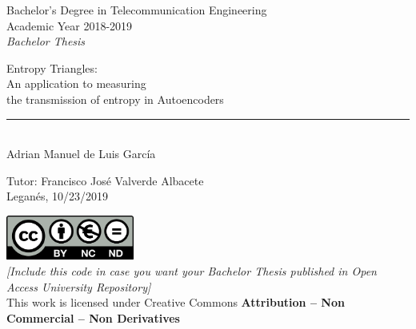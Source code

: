 \documentclass[12pt]{report}
\begin{document}
	
	\begin{titlepage}
		\begin{sffamily}
			\color{azulUC3M}
			\begin{center}
				\begin{figure}[H] %
				\end{figure}
				\vspace{2.5cm}
				\begin{Large}
					Bachelor's Degree in Telecommunication Engineering\\			
					Academic Year 2018-2019\\
					\vspace{2cm}		
					\textsl{Bachelor Thesis}
					\bigskip
					
				\end{Large}
				{\Huge Entropy Triangles:}\\
				{\Large An application to measuring\\the transmission of entropy in Autoencoders}\\
				\vspace*{0.5cm}
				\rule{10.5cm}{0.1mm}\\
				\vspace*{0.9cm}
				{\LARGE Adrian Manuel de Luis García}\\ 
				\vspace*{1cm}
				\begin{Large}
					Tutor: Francisco Jos\'e Valverde Albacete\\
					Legan\'es, 10/23/2019\\
				\end{Large}
			\end{center}
			\vfill
			\color{black}
			\includegraphics[width=4.2cm]{imagenes/creativecommons.png}\\  %
			\emph{[Include this code in case you want your Bachelor Thesis published in Open Access University Repository]}\\ %
			This work is licensed under Creative Commons \textbf{Attribution – Non Commercial – Non Derivatives}
		\end{sffamily}
	\end{titlepage}
	
\end{document}

